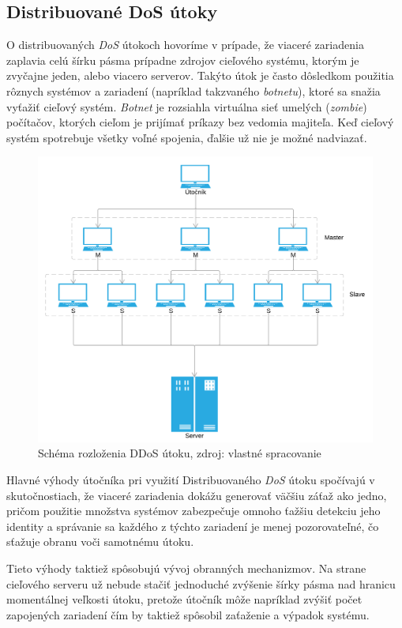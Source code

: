 \documentclass[
  digital, %
  table,   %
  lof,     %
  nolot,   %
  nocover
]{fithesis3}
\begin{document}
\subsection{Distribuované DoS útoky}
O distribuovaných \textit{DoS} útokoch hovoríme v prípade, že viaceré zariadenia zaplavia
celú šírku pásma prípadne zdrojov cieľového systému, ktorým je zvyčajne jeden, alebo viacero
serverov. Takýto útok je často dôsledkom použitia rôznych systémov a zariadení (napríklad
takzvaného \textit{botnetu}), ktoré sa snažia vyťažiť cieľový systém. \textit{Botnet} je rozsiahla
virtuálna sieť umelých (\textit{zombie}) počítačov, ktorých cieľom je prijímať príkazy bez
vedomia majiteľa. Keď cieľový systém spotrebuje všetky voľné spojenia, ďalšie už nie
je možné nadviazať. 

\begin{figure}[h]
  \centering
    \includegraphics[width=\textwidth]{images/ddos.png}
  \caption{Schéma rozloženia DDoS útoku, zdroj: vlastné spracovanie}
  \label{fig:ddos}
\end{figure}

Hlavné výhody útočníka pri využití Distribuovaného \textit{DoS} útoku
spočívajú v skutočnostiach, že viaceré zariadenia dokážu generovať väčšiu záťaž ako jedno,
pričom použitie množstva systémov zabezpečuje omnoho ťažšiu detekciu jeho identity a správanie
sa každého z týchto zariadení je menej pozorovateľné, čo sťažuje obranu voči samotnému útoku.

Tieto výhody taktiež spôsobujú vývoj obranných mechanizmov. Na strane cieľového serveru už
nebude stačiť jednoduché zvýšenie šírky pásma nad hranicu momentálnej veľkosti útoku, pretože
útočník môže napríklad zvýšiť počet zapojených zariadení čím by taktiež spôsobil zaťaženie a
výpadok systému.
\end{document}
